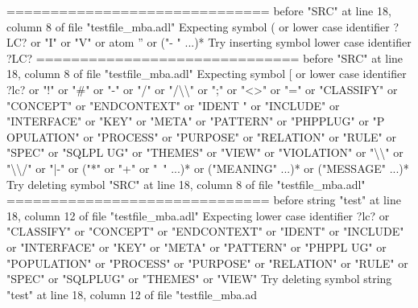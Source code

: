 {  ==============================\newline
  \newline
  before "SRC" at line 18, column 8 of file "testfile\_mba.adl"\newline
  Expecting symbol ( or lower case identifier ?LC? or "I" or "V" or atom '' or ("-\newline
  " ...)*\newline
  Try inserting symbol lower case identifier ?LC?\newline
  \newline
  ==============================\newline
  \newline
  before "SRC" at line 18, column 8 of file "testfile\_mba.adl"\newline
  Expecting symbol [ or lower case identifier ?lc? or "!" or "\#" or "-" or "/" or\newline
  "/\textbackslash{}\textbackslash{}" or ";" or "<>" or "=" or "CLASSIFY" or "CONCEPT" or "ENDCONTEXT" or "IDENT\newline
  " or "INCLUDE" or "INTERFACE" or "KEY" or "META" or "PATTERN" or "PHPPLUG" or "P\newline
  OPULATION" or "PROCESS" or "PURPOSE" or "RELATION" or "RULE" or "SPEC" or "SQLPL\newline
  UG" or "THEMES" or "VIEW" or "VIOLATION" or "\textbackslash{}\textbackslash{}" or "\textbackslash{}\textbackslash{}/" or "|-" or ("*" or "+"\newline
   or "~" ...)* or ("MEANING" ...)* or ("MESSAGE" ...)*\newline
  Try deleting symbol "SRC" at line 18, column 8 of file "testfile\_mba.adl"\newline
  \newline
  ==============================\newline
  \newline
  before string "test" at line 18, column 12 of file "testfile\_mba.adl"\newline
  Expecting lower case identifier ?lc? or "CLASSIFY" or "CONCEPT" or "ENDCONTEXT"\newline
  or "IDENT" or "INCLUDE" or "INTERFACE" or "KEY" or "META" or "PATTERN" or "PHPPL\newline
  UG" or "POPULATION" or "PROCESS" or "PURPOSE" or "RELATION" or "RULE" or "SPEC"\newline
  or "SQLPLUG" or "THEMES" or "VIEW"\newline
  Try deleting symbol string "test" at line 18, column 12 of file "testfile\_mba.ad\newline
}
